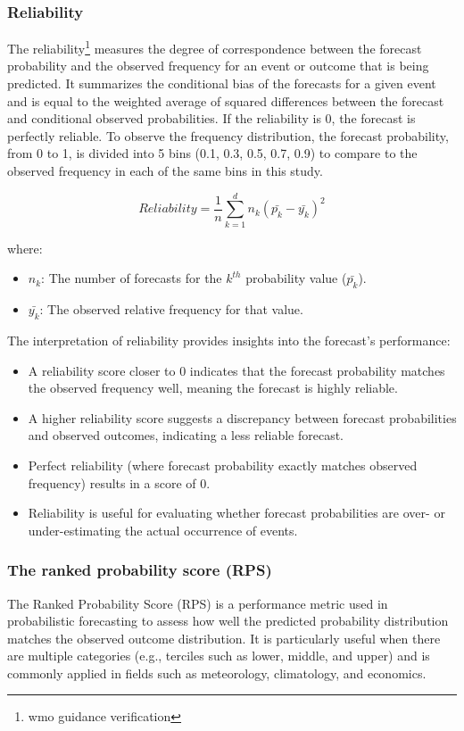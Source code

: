 \subsubsection{Reliability}
The reliability\footnote{wmo guidance verification} measures the degree of correspondence between the forecast probability and the observed frequency for an event or outcome that is being predicted. It summarizes the conditional bias of the forecasts for a given event and is equal to the weighted average of squared differences between the forecast and conditional observed probabilities. If the reliability is 0, the forecast is perfectly reliable. To observe the frequency distribution, the forecast probability, from 0 to 1, is divided into 5 bins (0.1, 0.3, 0.5, 0.7, 0.9) to compare to the observed frequency in each of the same bins in this study.

\[
Reliability = \frac{1}{n} \sum_{k=1}^{d} n_k (\bar{p_k} - \bar{y_k})^2
\]

where:  
\begin{itemize}
    \item \( n_k \): The number of forecasts for the \( k^{th} \) probability value (\( \bar{p_k} \)).  
    \item \( \bar{y_k} \): The observed relative frequency for that value.  
\end{itemize}

The interpretation of reliability provides insights into the forecast's performance:  
\begin{itemize}
    \item A reliability score closer to 0 indicates that the forecast probability matches the observed frequency well, meaning the forecast is highly reliable.  
    \item A higher reliability score suggests a discrepancy between forecast probabilities and observed outcomes, indicating a less reliable forecast.  
    \item Perfect reliability (where forecast probability exactly matches observed frequency) results in a score of 0.  
    \item Reliability is useful for evaluating whether forecast probabilities are over- or under-estimating the actual occurrence of events.  
\end{itemize}



\subsubsection{The ranked probability score (RPS)}
The Ranked Probability Score (RPS) is a performance metric used in probabilistic forecasting to assess how well the predicted probability distribution matches the observed outcome distribution. It is particularly useful when there are multiple categories (e.g., terciles such as lower, middle, and upper) and is commonly applied in fields such as meteorology, climatology, and economics.


